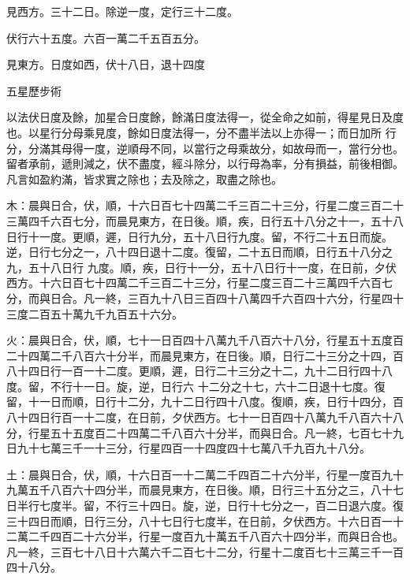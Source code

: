 \begin{pinyinscope}
 見西方。三十二日。除逆一度，定行三十二度。



 伏行六十五度。六百一萬二千五百五分。



 見東方。日度如西，伏十八日，退十四度



 五星歷步術



 以法伏日度及餘，加星合日度餘，餘滿日度法得一，從全命之如前，得星見日及度也。以星行分母乘見度，餘如日度法得一，分不盡半法以上亦得一；而日加所
 行分，分滿其母得一度，逆順母不同，以當行之母乘故分，如故母而一，當行分也。留者承前，遞則減之，伏不盡度，經斗除分，以行母為率，分有損益，前後相御。凡言如盈約滿，皆求實之除也；去及除之，取盡之除也。



 木：晨與日合，伏，順，十六日百七十四萬二千三百二十三分，行星二度三百二十三萬四千六百七分，而晨見東方，在日後。順，疾，日行五十八分之十一，五十八日行十一度。更順，遲，日行九分，五十八日行九度。留，不行二十五日而旋。逆，日行七分之一，八十四日退十二度。復留，二十五日而順，日行五十八分之九，五十八日行
 九度。順，疾，日行十一分，五十八日行十一度，在日前，夕伏西方。十六日百七十四萬二千三百二十三分，行星二度三百二十三萬四千六百七分，而與日合。凡一終，三百九十八日三百四十八萬四千六百四十六分，行星四十三度二百五十萬九千九百五十六分。



 火：晨與日合，伏，順，七十一日百四十八萬九千八百六十八分，行星五十五度百二十四萬二千八百六十分半，而晨見東方，在日後。順，日行二十三分之十四，百八十四日行一百一十二度。更順，遲，日行二十三分之十二，九十二日行四十八度。留，不行十一日。旋，逆，日行六
 十二分之十七，六十二日退十七度。復留，十一日而順，日行十二分，九十二日行四十八度。復順，疾，日行十四分，百八十四日行百一十二度，在日前，夕伏西方。七十一日百四十八萬九千八百六十八分，行星五十五度百二十四萬二千八百六十分半，而與日合。凡一終，七百七十九日九十七萬三千一十三分，行星四百一十四度四十七萬八千九百九十八分。



 土：晨與日合，伏，順，十六日百一十二萬二千四百二十六分半，行星一度百九十九萬五千八百六十四分半，而晨見東方，在日後。順，日行三十五分之三，八十七
 日半行七度半。留，不行三十四日。旋，逆，日行十七分之一，百二日退六度。復三十四日而順，日行三分，八十七日行七度半，在日前，夕伏西方。十六日百一十二萬二千四百二十六分半，行星一度百九十萬五千八百六十四分半，而與日合也。凡一終，三百七十八日十六萬六千二百七十二分，行星十二度百七十三萬三千一百四十八分。




\end{pinyinscope}
